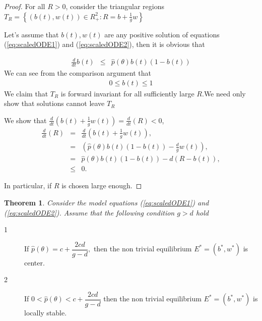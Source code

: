 \documentclass[12pt]{article}
\newtheorem{theorem}{Theorem}[section]
\begin{document}
\begin{proof}
For all $R>0$, consider the triangular regions $T_{R}=\left\{ \left(
b(t),w(t)\right) \in R_{+}^{2}:R=b+\frac{1}{g}w\right\} $

Let's assume that $b(t),w(t)$ are any positive solution of equations
(\ref{eq:scaledODE1}) and (\ref{eq:scaledODE2}), then it is obvious
that

\begin{eqnarray}
  \frac{d}{dt}b(t) & \leq & \hat{p}\left( \theta \right) b(t)\left( 1-b(t)\right) 
\end{eqnarray}
We can see from the comparison argument that
\begin{eqnarray}
  0\leq b(t)\leq 1
\end{eqnarray}
We claim that $T_{R}$ is forward invariant for all sufficiently large $R.$We
need only show that solutions cannot leave $T_{R}$

We show that
$\frac{d}{dt}\left( b(t)+\frac{1}{g}w(t)\right) =\frac{d}{dt}%
\left( R\right) <0$,
\begin{eqnarray}
  \frac{d}{dt}\left( R\right) & = & \frac{d}{dt}\left( b(t)+\frac{1}{g}w(t)\right), \\
                              & = & \left( \hat{p}\left( \theta \right) b(t)
                                    \left( 1-b(t)\right) -
                                     \frac{d}{g}w\left( t\right) \right), \\
                              & = & \hat{p}\left( \theta \right) b(t)\left(1-b(t)\right) -
                                    d\left( R-b(t)\right), \\
                              & \leq & 0.
\end{eqnarray}


In particular, if $R$ is chosen large enough.
\end{proof}
\begin{theorem}
   Consider the model equations (\ref{eq:scaledODE1}) and
  (\ref{eq:scaledODE2}). Assume that the following condition $g>d$
  hold
\end{theorem}

\begin{description}
\item[1]  If $%
\hat{p}(\theta )=c+\dfrac{2cd}{g-d},$ then the non trivial equilibrium $%
E^{\ast }=(b^{\ast },w^{\ast })$ is center.

\item[2] If $0<\hat{p}(\theta )<c+\dfrac{2cd}{g-d}$ then the non trivial
equilibrium $E^{\ast }=(b^{\ast },w^{\ast })$ is locally stable.
\end{description}
\end{document}
